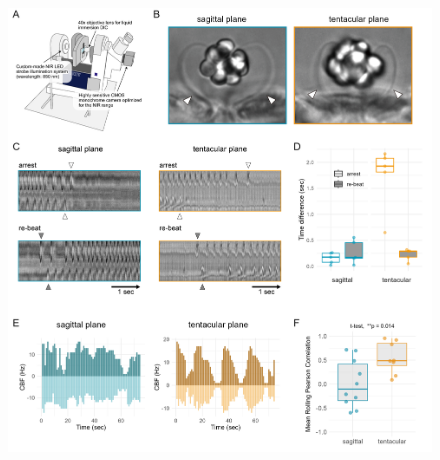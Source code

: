 \documentclass[
  11pt,
]{article}
\begin{document}
\begin{figure}[H]

{\centering \includegraphics{figures/Figure4.png}

}


\end{figure}
\end{document}
